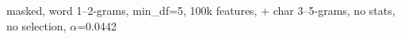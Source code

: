 masked, word 1--2-grams, min\_df=5, 100k features, + char 3--5-grams, no stats, no selection, $\alpha$=0.0442